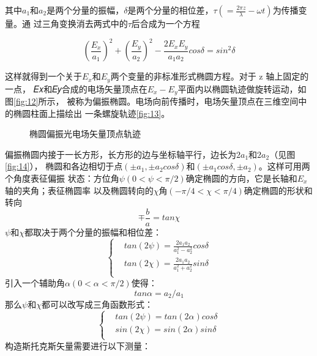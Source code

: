 \documentclass[10pt,a4paper,twoside,UTF8]{ctexart}
\begin{document}
其中$a_1$和$a_2$是两个分量的振幅，$\delta$是两个分量的相位差，$\tau(=\frac{2\pi z}{\lambda}-\omega t)$为传播变量。通
过三角变换消去两式中的$\tau$后合成为一个方程

\begin{equation}
	\left(\frac{E_x}{a_1}\right)^2+\left(\frac{E_y}{a_2}\right)^2-\frac{2E_x E_y}{a_1 a_2} cos\delta= sin^{2} \delta
\end{equation}

这样就得到一个关于$E_x$和$E_y$两个变量的非标准形式椭圆方程。对于 z 轴上固定的一点，
𝐸𝑥和𝐸𝑦合成的电场矢量顶点在$E_x-E_y$平面内以椭圆轨迹做旋转运动，如图\ref{fig:12}所示，
被称为偏振椭圆。电场向前传播时，电场矢量顶点在三维空间中的椭圆柱面上描绘出
一条螺旋轨迹\ref{fig:13}。

\begin{figure}[H]
	\centering
	\caption{椭圆偏振光电场矢量顶点轨迹}
\end{figure}

偏振椭圆内接于一长方形，长方形的边与坐标轴平行，边长为$2a_1$和$2a_2$（见图\ref{fig:14}），
椭圆和各边相切于点$(\pm a_1,\pm a_2 cos \delta )$和$(\pm a_1 cos \delta,\pm a_2)$。这样可用两个角度表征偏振
状态：方位角$\psi (0< \psi < \pi /2)$确定椭圆的方向，它是长轴和$E_x$轴的夹角；表征椭圆率
以及椭圆转向的$\chi $角$(-\pi /4< \chi< \pi/4)$确定椭圆的形状和转向
\begin{equation}
	\mp \frac{b}{a} = tan \chi
\end{equation}
$\psi$和$\chi$都取决于两个分量的振幅和相位差：
\[\left\{
\begin{aligned}
&	tan (2\psi)=\frac{2a_1 a_2}{a^2_1-a^2_2}cos\delta \\
&	tan (2\chi)=\frac{2a_1 a_2}{a^2_1+a^2_2}sin\delta\\
\end{aligned}
\right.
\]
引入一个辅助角$\alpha(0<\alpha<\pi/2)$使得：
\begin{equation}
	tan\alpha=a_2/a_1
\end{equation}
那么$\psi$和$\chi$都可以改写成三角函数形式：
\[\left\{
\begin{aligned}
&	tan (2\psi) = tan (2\alpha)cos \delta \\
&	sin (2\chi) = sin (2\alpha)sin \delta\\
\end{aligned}
\right.
\]
构造斯托克斯矢量需要进行以下测量：
\end{document}
